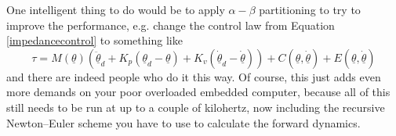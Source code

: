 \documentclass[]{article}
\begin{document}
One intelligent thing to do would be to apply $\alpha-\beta$ partitioning to try to improve the performance, e.g. change the control law from Equation \ref{impedancecontrol} to something like
\begin{equation}
 \tau = M(\underline{\theta})\left(\ddot{\underline{\theta}}_{d} + K_{p}(\underline{\theta}_{d} - \underline{\theta}) + K_{v}(\dot{\underline{\theta}}_{d} - \dot{\underline{\theta}})\right) + C(\underline{\theta}, \dot{\underline{\theta}}) + E(\underline{\theta}, \dot{\underline{\theta}})
\end{equation}
and there are indeed people who do it this way. Of course, this just adds even more demands on your poor overloaded embedded computer, because all of this still needs to be run at up to a couple of kilohertz, now including the recursive Newton--Euler scheme you have to use to calculate the forward dynamics.
\end{document}
